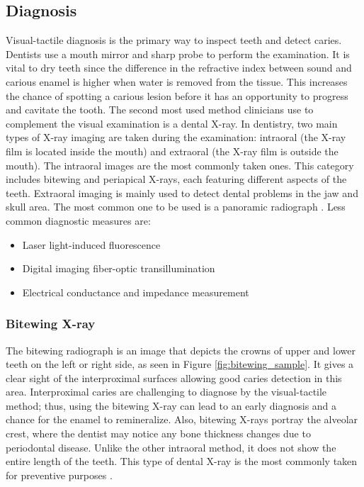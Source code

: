 \subsection{Diagnosis}
Visual-tactile diagnosis is the primary way to inspect teeth and detect caries. Dentists use a mouth mirror and sharp probe to perform the examination. It is vital to dry teeth since the difference in the refractive index between sound and carious enamel is higher when water is removed from the tissue. This increases the chance of spotting a carious lesion before it has an opportunity to progress and cavitate the tooth.
The second most used method clinicians use to complement the visual examination is a dental X-ray. In dentistry, two main types of X-ray imaging are taken during the examination: intraoral (the X-ray film is located inside the mouth) and extraoral (the X-ray film is outside the mouth). The intraoral images are the most commonly taken ones. This category includes bitewing and periapical X-rays, each featuring different aspects of the teeth. Extraoral imaging is mainly used to detect dental problems in the jaw and skull area. The most common one to be used is a panoramic radiograph \cite{2015}. \newline
Less common diagnostic measures are:

\begin{itemize}
    \item Laser light-induced fluorescence
    \item Digital imaging fiber-optic transillumination
    \item Electrical conductance and impedance measurement
\end{itemize}

\subsubsection{Bitewing X-ray}
The bitewing radiograph is an image that depicts the crowns of upper and lower teeth on the left or right side, as seen in Figure \ref{fig:bitewing_sample}. It gives a clear sight of the interproximal surfaces allowing good caries detection in this area. Interproximal caries are challenging to diagnose by the visual-tactile method; thus, using the bitewing X-ray can lead to an early diagnosis and a chance for the enamel to remineralize. Also, bitewing X-rays portray the alveolar crest, where the dentist may notice any bone thickness changes due to periodontal disease. Unlike the other intraoral method, it does not show the entire length of the teeth. This type of dental X-ray is the most commonly taken for preventive purposes \cite{2015}.

